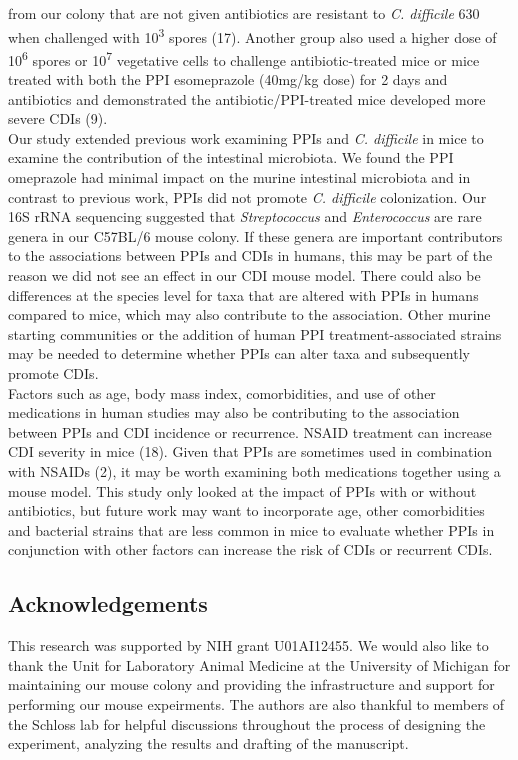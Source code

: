 \documentclass[11pt,]{article}
\begin{document}
from our colony that are not given antibiotics are resistant to \emph{C.
difficile} 630 when challenged with 10\textsuperscript{3} spores (17).
Another group also used a higher dose of 10\textsuperscript{6} spores or
10\textsuperscript{7} vegetative cells to challenge antibiotic-treated
mice or mice treated with both the PPI esomeprazole (40mg/kg dose) for 2
days and antibiotics and demonstrated the antibiotic/PPI-treated mice
developed more severe CDIs (9).\\
Our study extended previous work examining PPIs and \emph{C. difficile}
in mice to examine the contribution of the intestinal microbiota. We
found the PPI omeprazole had minimal impact on the murine intestinal
microbiota and in contrast to previous work, PPIs did not promote
\emph{C. difficile} colonization. Our 16S rRNA sequencing suggested that
\emph{Streptococcus} and \emph{Enterococcus} are rare genera in our
C57BL/6 mouse colony. If these genera are important contributors to the
associations between PPIs and CDIs in humans, this may be part of the
reason we did not see an effect in our CDI mouse model. There could also
be differences at the species level for taxa that are altered with PPIs
in humans compared to mice, which may also contribute to the
association. Other murine starting communities or the addition of human
PPI treatment-associated strains may be needed to determine whether PPIs
can alter taxa and subsequently promote CDIs.\\
Factors such as age, body mass index, comorbidities, and use of other
medications in human studies may also be contributing to the association
between PPIs and CDI incidence or recurrence. NSAID treatment can
increase CDI severity in mice (18). Given that PPIs are sometimes used
in combination with NSAIDs (2), it may be worth examining both
medications together using a mouse model. This study only looked at the
impact of PPIs with or without antibiotics, but future work may want to
incorporate age, other comorbidities and bacterial strains that are less
common in mice to evaluate whether PPIs in conjunction with other
factors can increase the risk of CDIs or recurrent CDIs.

\subsection{Acknowledgements}\label{acknowledgements}

This research was supported by NIH grant U01AI12455. We would also like
to thank the Unit for Laboratory Animal Medicine at the University of
Michigan for maintaining our mouse colony and providing the
infrastructure and support for performing our mouse expeirments. The
authors are also thankful to members of the Schloss lab for helpful
discussions throughout the process of designing the experiment,
analyzing the results and drafting of the manuscript.
\end{document}

